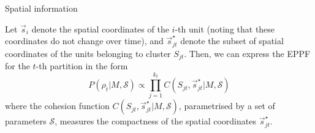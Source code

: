 \documentclass[
	11pt, %
 xcolor={dvipsnames,svgnames}
]{beamer}
\begin{document}
    

\begin{frame}{Spatial information}
    
Let $\vec{s}_i$ denote the spatial coordinates of the $i$-th unit (noting that these coordinates do not change over time), and $\vec{s}^\star_{jt}$ denote the subset of spatial coordinates of the units belonging to cluster $S_{jt}$. Then, we can express the EPPF for the $t$-th partition in the form
\begin{equation*}
    P(\rho_t|M,\mathcal{S}) \propto \prod_{j=1}^{k_t} C(S_{jt},\vec{s}_{jt}^\star|M,\mathcal{S})
    \label{eppf spatially informed}
\end{equation*}
where the \alert{cohesion function} $C(S_{jt}, \vec{s}_{jt}^\star|M, \mathcal{S})$, parametrised by a set of parameters $\mathcal{S}$, measures the compactness of the spatial coordinates $\vec{s}_{jt}^\star$.
\end{frame}
\end{document}
